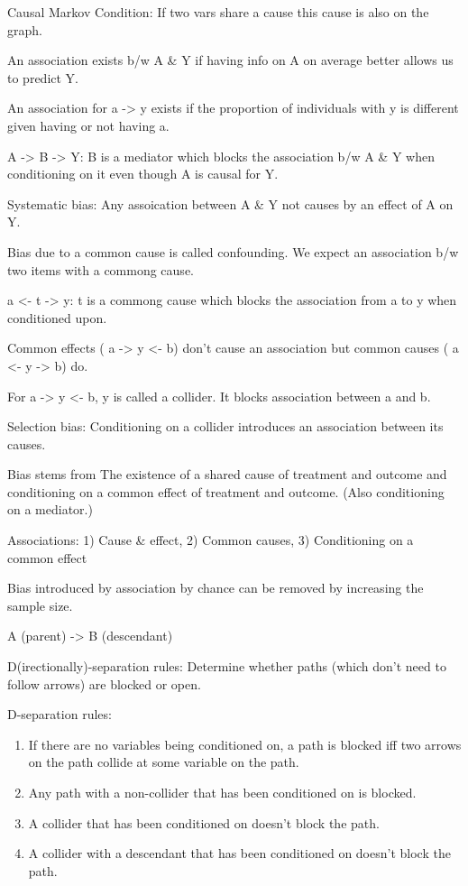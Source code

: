 \documentclass[]{book}
\begin{document}
Causal Markov Condition: If two vars share a cause this cause is also on
the graph.

An association exists b/w A \& Y if having info on A on average better
allows us to predict Y.

An association for a -\textgreater{} y exists if the proportion of
individuals with y is different given having or not having a.

A -\textgreater{} B -\textgreater{} Y: B is a mediator which blocks the
association b/w A \& Y when conditioning on it even though A is causal
for Y.

Systematic bias: Any assoication between A \& Y not causes by an effect
of A on Y.

Bias due to a common cause is called confounding. We expect an
association b/w two items with a commong cause.

a \textless{}- t -\textgreater{} y: t is a commong cause which blocks
the association from a to y when conditioned upon.

Common effects ( a -\textgreater{} y \textless{}- b) don't cause an
association but common causes ( a \textless{}- y -\textgreater{} b) do.

For a -\textgreater{} y \textless{}- b, y is called a collider. It
blocks association between a and b.

Selection bias: Conditioning on a collider introduces an association
between its causes.

Bias stems from The existence of a shared cause of treatment and outcome
and conditioning on a common effect of treatment and outcome. (Also
conditioning on a mediator.)

Associations: 1) Cause \& effect, 2) Common causes, 3) Conditioning on a
common effect

Bias introduced by association by chance can be removed by increasing
the sample size.

A (parent) -\textgreater{} B (descendant)

D(irectionally)-separation rules: Determine whether paths (which don't
need to follow arrows) are blocked or open.

D-separation rules:

\begin{enumerate}
\def\labelenumi{\arabic{enumi}.}
\item
  If there are no variables being conditioned on, a path is blocked iff
  two arrows on the path collide at some variable on the path.
\item
  Any path with a non-collider that has been conditioned on is blocked.
\item
  A collider that has been conditioned on doesn't block the path.
\item
  A collider with a descendant that has been conditioned on doesn't
  block the path.
\end{enumerate}
\end{document}
